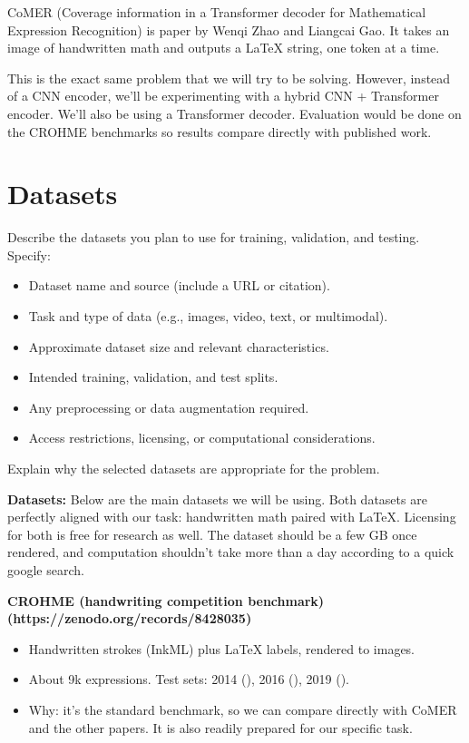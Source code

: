 \documentclass[11pt]{article}
\newcommand{\blue}[1]{\textcolor{cyan!60!black}{#1}}
\begin{document}
\blue{
CoMER (Coverage information in a Transformer decoder for Mathematical Expression Recognition) is paper by Wenqi Zhao and Liangcai Gao. It takes an image of handwritten math
and outputs a LaTeX string, one token at a time.
}

\blue{
This is the exact same problem that we will try to be solving. However, instead of a CNN encoder, we'll be experimenting with a hybrid CNN + Transformer encoder.
 We'll also be using a Transformer decoder. Evaluation would be done on the CROHME benchmarks so results compare directly with published work.
}

\section{Datasets}

Describe the datasets you plan to use for training, validation,
and testing. Specify:
\begin{itemize}[noitemsep]
    \item Dataset name and source (include a URL or citation).
    \item Task and type of data (e.g., images, video, text, or multimodal).
    \item Approximate dataset size and relevant characteristics.
    \item Intended training, validation, and test splits.
    \item Any preprocessing or data augmentation required.
    \item Access restrictions, licensing, or computational considerations.
\end{itemize}

Explain why the selected datasets are appropriate for the problem.

\blue{
\textbf{Datasets:} Below are the main datasets we will be using. Both datasets are perfectly aligned with our task: handwritten math paired with LaTeX.
Licensing for both is free for research as well. The dataset should be a few GB once rendered, and computation shouldn't take more than a day according to a quick google search.
}

\blue{
  \textbf{CROHME (handwriting competition benchmark) (https://zenodo.org/records/8428035)}
\begin{itemize}
    \item Handwritten strokes (InkML) plus LaTeX labels, rendered to images.
    \item About 9k expressions. Test sets: 2014 (\text{\textasciitilde1k}), 2016 (\text{\textasciitilde1.1k}), 2019 (\text{\textasciitilde1.2k}).
    \item Why: it’s the standard benchmark, so we can compare directly with CoMER and the other papers. It is also readily prepared for our specific task.
\end{itemize}
}
\end{document}
